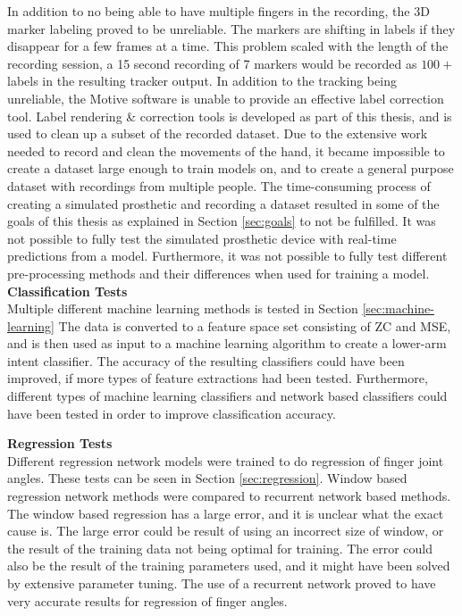 \documentclass[../main.tex]{subfiles}
\begin{document}
In addition to no being able to have multiple fingers in the recording, the 3D marker labeling proved to be unreliable.
The markers are shifting in labels if they disappear for a few frames at a time.
This problem scaled with the length of the recording session, a 15 second recording of 7 markers would be recorded as $100+$ labels in the resulting tracker output.
In addition to the tracking being unreliable, the Motive software is unable to provide an effective label correction tool.
Label rendering \& correction tools is developed as part of this thesis, and is used to clean up a subset of the recorded dataset.
Due to the extensive work needed to record and clean the movements of the hand, it became impossible to create a dataset large enough to train models on, and to create a general purpose dataset with recordings from multiple people. 
The time-consuming process of creating a simulated prosthetic and recording a dataset resulted in some of the goals of this thesis as explained in Section \ref{sec:goals} to not be fulfilled.
It was not possible to fully test the simulated prosthetic device with real-time predictions from a model. 
Furthermore, it was not possible to fully test different pre-processing methods and their differences when used for training a model.
\newpage
\textbf{Classification Tests}\\
Multiple different machine learning methods is tested in Section  \ref{sec:machine-learning}
The data is converted to a feature space set consisting of \gls{ZC} and \gls{MSE}, and is then used as input to a machine learning algorithm to create a lower-arm intent classifier.
The accuracy of the resulting classifiers could have been improved, if more types of feature extractions had been tested.
Furthermore, different types of machine learning classifiers and network based classifiers could have been tested in order to improve classification accuracy.

\textbf{Regression Tests}\\
Different regression network models were trained to do regression of finger joint angles. These tests can be seen in Section \ref{sec:regression}.
Window based regression network methods were compared to recurrent network based methods.
The window based regression has a large error, and it is unclear what the exact cause is.
The large error could be result of using an incorrect size of window, or the result of the training data not being optimal for training.
The error could also be the result of the training parameters used, and it might have been solved by extensive parameter tuning.
The use of a recurrent network proved to have very accurate results for regression of finger angles.
\end{document}
